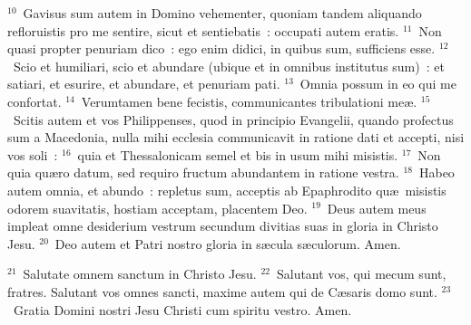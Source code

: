 ${}^{10}$~Gavisus sum autem in Domino vehementer, quoniam tandem aliquando refloruistis pro me sentire, sicut et sentiebatis~: occupati autem eratis.
${}^{11}$~Non quasi propter penuriam dico~: ego enim didici, in quibus sum, sufficiens esse.
${}^{12}$~Scio et humiliari, scio et abundare (ubique et in omnibus institutus sum)~: et satiari, et esurire, et abundare, et penuriam pati.
${}^{13}$~Omnia possum in eo qui me confortat.
${}^{14}$~Verumtamen bene fecistis, communicantes tribulationi me\ae .
${}^{15}$~Scitis autem et vos Philippenses, quod in principio Evangelii, quando profectus sum a Macedonia, nulla mihi ecclesia communicavit in ratione dati et accepti, nisi vos soli~:
${}^{16}$~quia et Thessalonicam semel et bis in usum mihi misistis.
${}^{17}$~Non quia qu\ae ro datum, sed requiro fructum abundantem in ratione vestra.
${}^{18}$~Habeo autem omnia, et abundo~: repletus sum, acceptis ab Epaphrodito qu\ae\ misistis odorem suavitatis, hostiam acceptam, placentem Deo.
${}^{19}$~Deus autem meus impleat omne desiderium vestrum secundum divitias suas in gloria in Christo Jesu.
${}^{20}$~Deo autem et Patri nostro gloria in s\ae cula s\ae culorum. Amen.


${}^{21}$~Salutate omnem sanctum in Christo Jesu.
${}^{22}$~Salutant vos, qui mecum sunt, fratres. Salutant vos omnes sancti, maxime autem qui de C\ae saris domo sunt.
${}^{23}$~Gratia Domini nostri Jesu Christi cum spiritu vestro. Amen.
